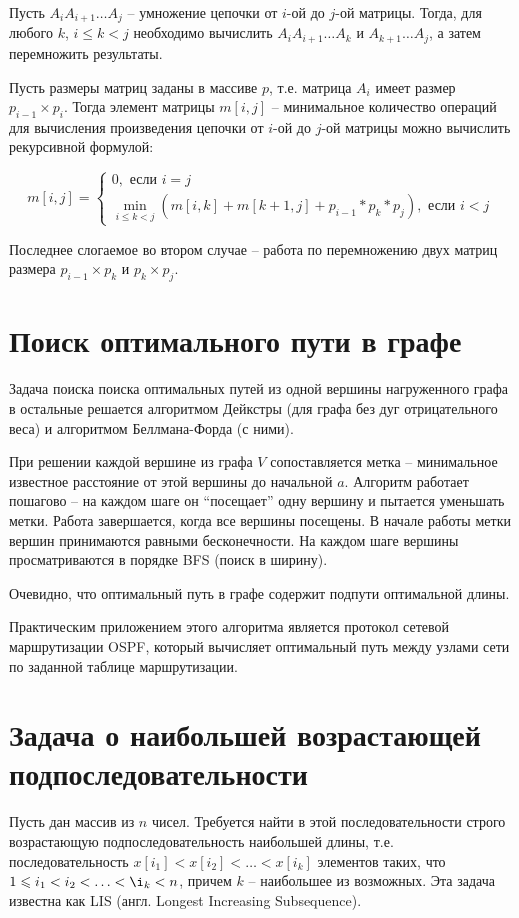 \documentclass[a4paper,11pt]{article}
\begin{document}
Пусть $A_i A_{i+1} \ldots A_j$ -- умножение цепочки от $i$-ой до $j$-ой матрицы.
Тогда, для любого $k$, $i \leqslant k < j$ необходимо вычислить 
$A_i A_{i+1} \ldots A_k$ и $A_{k+1} \ldots A_j$, а затем перемножить результаты.

Пусть размеры матриц заданы в массиве $p$, т.е. матрица $A_i$ имеет размер
$p_{i-1} \times p_i$. Тогда элемент матрицы $m[i, j]$ -- минимальное количество
операций для вычисления произведения цепочки от $i$-ой до $j$-ой матрицы
можно вычислить рекурсивной формулой:

\begin{equation*}
  m[i, j] = \begin{cases}
    0, \text{ если } i = j \\
    \min_{i \leqslant k < j} (m[i, k] + m[k+1, j] + p_{i-1}*p_k*p_j),
    \text{ если } i < j
    \end{cases}
\end{equation*}

Последнее слогаемое во втором случае -- работа по перемножению двух матриц
размера $p_{i-1} \times p_k$ и $p_k \times p_j$.

\section{Поиск оптимального пути в графе}
Задача поиска поиска оптимальных путей из одной вершины нагруженного графа
в остальные решается алгоритмом Дейкстры (для графа без дуг отрицательного
веса) и алгоритмом Беллмана-Форда (с ними). 

При решении каждой вершине из графа $V$ сопоставляется метка -- минимальное
известное расстояние от этой вершины до начальной $a$. Алгоритм работает
пошагово -- на каждом шаге он ``посещает'' одну вершину и пытается уменьшать
метки. Работа завершается, когда все вершины посещены. В начале работы метки
вершин принимаются равными бесконечности. На каждом шаге вершины
просматриваются в порядке BFS (поиск в ширину).

Очевидно, что оптимальный путь в графе содержит подпути оптимальной длины.

Практическим приложением этого алгоритма является протокол сетевой
маршрутизации OSPF, который вычисляет оптимальный путь между узлами сети по
заданной таблице маршрутизации.

\section{Задача о наибольшей возрастающей подпоследовательности}
Пусть дан массив из $n$ чисел. Требуется найти в этой последовательности
строго возрастающую подпоследовательность наибольшей длины, т.е. 
последовательность $x[i_1] < x[i_2] < \ldots < x[i_k]$ элементов таких,
что $1 \leqslant i_1 < i_2 < \ldots < \i_k < n$, причем $k$ -- наибольшее из
возможных. Эта задача известна как LIS (англ. Longest Increasing Subsequence).
\end{document}
